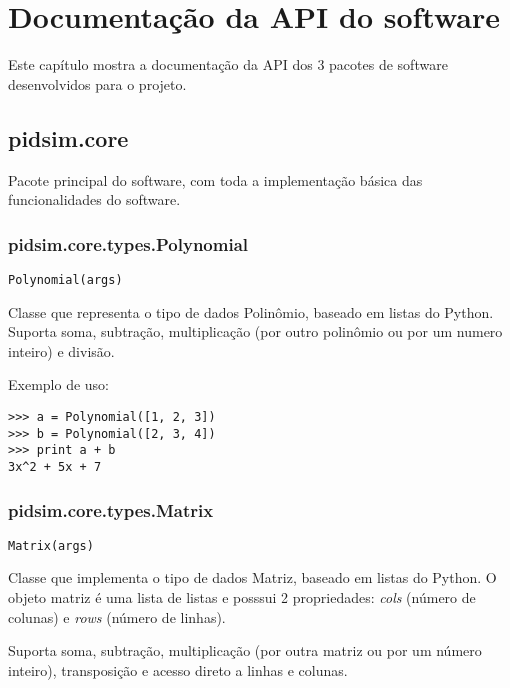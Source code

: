 \chapter{Documentação da \acs{API} do software}

    Este capítulo mostra a documentação da \ac{API} dos 3 pacotes de
    software desenvolvidos para o projeto.


\section{pidsim.core}

    Pacote principal do software, com toda a implementação básica das 
    funcionalidades do software.

\subsection{pidsim.core.types.Polynomial}

    \begin{verbatim}
Polynomial(args)
    \end{verbatim}

    Classe que representa o tipo de dados Polinômio, baseado em listas
    do Python. Suporta soma, subtração, multiplicação (por outro polinômio
    ou por um numero inteiro) e divisão.
    
    Exemplo de uso:

    \begin{verbatim}
>>> a = Polynomial([1, 2, 3])
>>> b = Polynomial([2, 3, 4])
>>> print a + b
3x^2 + 5x + 7
    \end{verbatim}
    
\subsection{pidsim.core.types.Matrix}

    \begin{verbatim}
Matrix(args)
    \end{verbatim}

    Classe que implementa o tipo de dados Matriz, baseado em listas do
    Python. O objeto matriz é uma lista de listas e posssui 2 propriedades:
    \textit{cols} (número de colunas) e \textit{rows} (número de linhas).
    
    Suporta soma, subtração, multiplicação (por outra matriz ou por um
    número inteiro), transposição e acesso direto a linhas e colunas.
    
